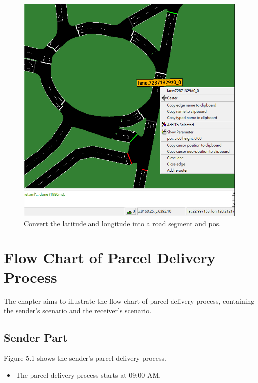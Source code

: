 \documentclass[12pt]{ksthesis}
\begin{document}
\begin{thesis}
{\begin{figure}[t]
\centering
\includegraphics[scale=1.0]{./Thesis_figures/F4-6_GPS_SUMOMap.PNG}
\caption{\large Convert the latitude and longitude into a road segment and pos.}
\vspace{0.5cm}
\label{Fig:Convert_To_Road}
\end{figure}




\chapter{Flow Chart of Parcel Delivery Process}\label{Chap:Flow Chart of Parcel Delivery Process}

The chapter aims to illustrate the flow chart of parcel delivery process, containing the sender’s scenario and the receiver’s scenario.

\section{Sender Part}

Figure 5.1 shows the sender’s parcel delivery process.
\begin{itemize}
\item
The parcel delivery process starts at 09:00 AM.


\end{itemize}}
\end{thesis}
\end{document}
